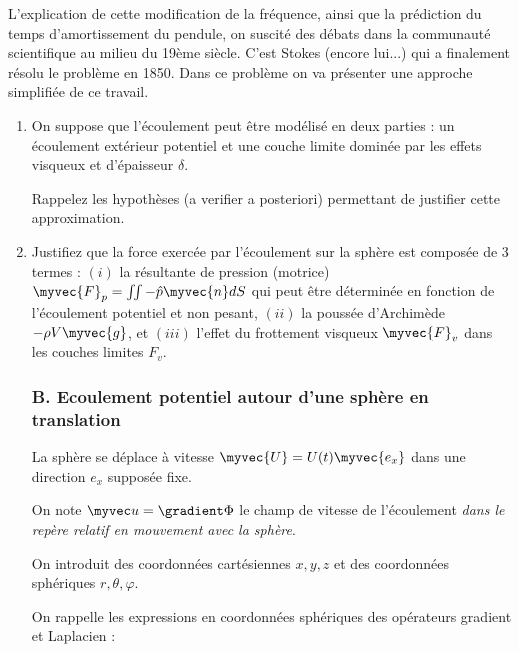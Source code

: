 L'explication de cette modification de la fréquence, ainsi que la prédiction du temps d'amortissement du pendule, on suscité des débats dans la communauté scientifique au milieu du 19ème siècle. C'est Stokes (encore lui...) qui a finalement résolu le problème en 1850. Dans ce problème on va présenter une approche simplifiée de ce travail.


\begin{enumerate}

\subsubsection*{A. Questions préliminaires}


\item
On suppose que l'écoulement peut être modélisé en deux parties : un écoulement extérieur potentiel et une couche limite dominée par les effets visqueux et d'épaisseur $\delta$. 

Rappelez les hypothèses (a verifier a posteriori) permettant de justifier cette approximation.


\item Justifiez que la force exercée par l'écoulement sur la sphère est composée de 3 termes : 
$(i)$ la résultante de pression (motrice) 
$\myvec{F}_p = \iint - \hat{p} \myvec{n} dS$ qui peut être déterminée en fonction de l'écoulement potentiel et non pesant, $(ii)$ la poussée d'Archimède $-\rho V \myvec{g}$, et $(iii)$ l'effet du frottement visqueux $\myvec{F}_v$ dans les couches limites $F_v$.


\subsubsection*{B. Ecoulement potentiel autour d'une sphère en translation}

La sphère se déplace à vitesse $\myvec{U} =U(t) \myvec{e_x}$ dans une direction $e_x$ supposée fixe.


On note $\myvec u = \gradient \Phi$ le champ de vitesse de l'écoulement {\em dans le repère relatif en mouvement avec la sphère}.

On introduit des coordonnées cartésiennes $x,y,z$ et des coordonnées sphériques 
$r,\theta,\varphi$.



On rappelle les expressions en coordonnées sphériques des opérateurs gradient et Laplacien :


\end{enumerate}
